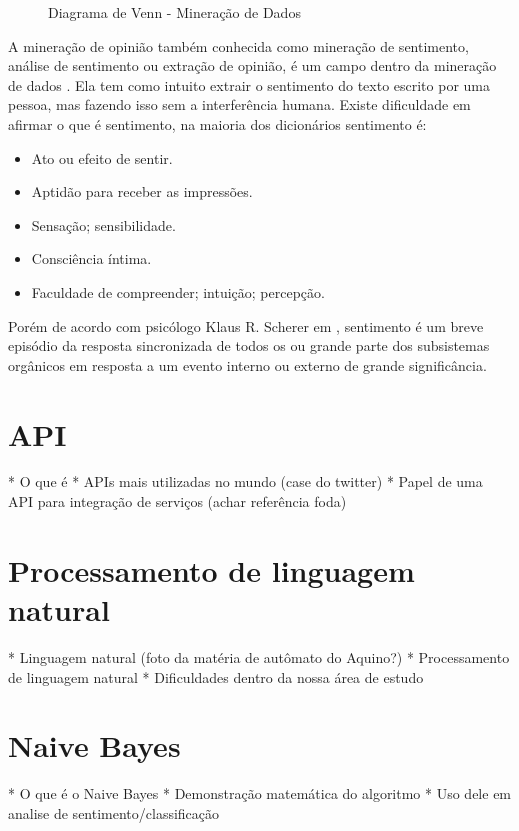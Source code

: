 \begin{figure}[ht]
	
	\centering{}
	\caption{Diagrama de Venn - Mineração de Dados}
	\label{uni}
\end{figure}

A mineração de opinião também conhecida como mineração de sentimento, análise de sentimento ou extração de opinião, é um campo dentro da mineração de dados \cite{santos2014mineraccao}. Ela tem como intuito extrair o sentimento do texto escrito por uma pessoa, mas fazendo isso sem a interferência humana. Existe  dificuldade em afirmar o que é sentimento, na maioria dos dicionários sentimento é:
\begin{itemize}
\item Ato ou efeito de sentir.
\item Aptidão para receber as impressões.
\item Sensação; sensibilidade.
\item Consciência íntima.
\item Faculdade de compreender; intuição; percepção.
\end{itemize}

Porém de acordo com psicólogo Klaus R. Scherer em \cite{scherer2001emotional}, sentimento é um breve episódio da resposta sincronizada de todos os ou grande parte dos subsistemas orgânicos em resposta a um evento interno ou externo de grande significância.

 

\section{API}\label{sec:api}
* O que é
* APIs mais utilizadas no mundo (case do twitter)
* Papel de uma API para integração de serviços (achar referência foda)

\section{Processamento de linguagem natural}\label{sec:nlp}
* Linguagem natural (foto da matéria de autômato do Aquino?)
* Processamento de linguagem natural
* Dificuldades dentro da nossa área de estudo


\section{Naive Bayes}\label{sec:naive_bayes}
* O que é o Naive Bayes
* Demonstração matemática do algoritmo
* Uso dele em analise de sentimento/classificação


